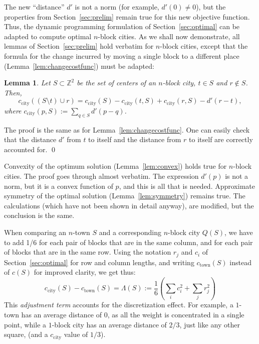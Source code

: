 \documentclass[preprint,authoryear,12pt]{elsarticle}
\newtheorem{lemma}[theorem]{Lemma}
\begin{document}
The new ``distance'' $d'$ is not a norm (for example, $d'(0)\ne0$),
but the properties from Section~\ref{sec:prelim} remain true for this
new objective function.  Thus, the dynamic programming formulation of
Section~\ref{sec:optimal} can be adapted to compute optimal $n$-block
cities.
As we shall now demonstrate,
all lemmas of Section~\ref{sec:prelim} hold verbatim
for $n$-block cities, except that the formula for
the change incurred by moving a single block to a different place
(Lemma~\ref{lem:changecostfunc}) must be adapted:
\begingroup
\renewcommand\thetheorem{\ref{lem:changecostfunc}$\mathit{'}$}
\begin{lemma}
  Let $S\subset \mathbb{Z}^2$
be the set of centers of an $n$-block city, $t\in S$ and $r\notin S$. Then,
$$
c_{\mathrm{city}}( (S\setminus t)\cup r) = c_{\mathrm{city}}(S) - c_{\mathrm{city}}(t,S) + c_{\mathrm{city}}(r,S) - d'(r-t),
$$
where
$c_{\mathrm{city}}(p,S):= \sum_{q\in S} d'(p-q)$.
\end{lemma}
\endgroup
The proof is the same as for
Lemma~\ref{lem:changecostfunc}. One can easily check
that the distance $d'$ from $t$ to itself
and the distance from $r$ to itself
are correctly accounted for.
\qed

Convexity of the optimum solution (Lemma~\ref{lem:convex}) holds
true for $n$-block cities. The proof goes through almost verbatim.
The expression $d'(p)$ is not a norm, but it is a convex function of
$p$, and this is all that is needed.
Approximate symmetry of the optimal solution (Lemma~\ref{lem:symmetry})
remains true. The calculations (which have not been shown in detail
anyway), are modified, but the conclusion is the same.


When comparing an $n$-town $S$ and a corresponding $n$-block city
$Q(S)$, we have to add 1/6 for each pair of blocks that are in the
same column, and for each pair of blocks that are in the same row.
 Using the notation $r_j$ and $c_i$ of Section~\ref{sec:optimal}
for row and column lengths,
and writing
$c_{\textrm{town}}(S)$ instead of $c(S)$ for improved clarity,
 we get thus:
\begin{equation}
  \label{eq:lambda}
\textstyle
c_{\textrm{city}}(S)-c_{\textrm{town}}(S) =
\Lambda(S):=\frac{1}{6} (\sum_i c_i^2 +\sum_j r_j^2)
\end{equation}
This {\em adjustment term} accounts for the discretization effect.
For example, a $1$-town has an average distance of 0, as all the weight is
concentrated in a single point, while a $1$-block city has
an average distance of $2/3$,
just like any other square,
 (and a $c_{\textrm{city}}$ value of $1/3$).
\end{document}
